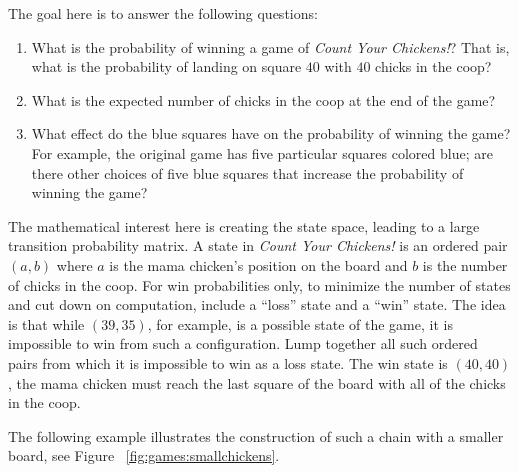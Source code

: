 \documentclass[12pt]{article}
\begin{document}
The goal here is to answer the following questions:
\begin{enumerate}
    \item
        What is the probability of winning a game of \emph{Count Your
        Chickens!}?  That is, what is the probability of landing on
        square \( 40 \) with \( 40 \) chicks in the coop?
    \item
        What is the expected number of chicks in the coop at the end of
        the game?
    \item
        What effect do the blue squares have on the probability of
        winning the game?  For example, the original game has five
        particular squares colored blue; are there other choices of five
        blue squares that increase the probability of winning the game?
\end{enumerate}

The mathematical interest here is creating the state space, leading to a
large transition probability matrix.  A state in \emph{Count Your
Chickens!} is an ordered pair \( (a, b) \) where \( a \) is the mama
chicken's position on the board and \( b \) is the number of chicks in
the coop.  For win probabilities only, to minimize the number of states
and cut down on computation, include a ``loss'' state and a ``win''
state.  The idea is that while \( (39, 35) \), for example, is a
possible state of the game, it is impossible to win from such a
configuration.  Lump together all such ordered pairs from which it is
impossible to win as a loss state.  The win state is \( (40, 40) \), the
mama chicken must reach the last square of the board with all of the
chicks in the coop.

The following example illustrates the construction of such a chain with
a smaller board, see Figure~%
\ref{fig:games:smallchickens}.
\end{document}
